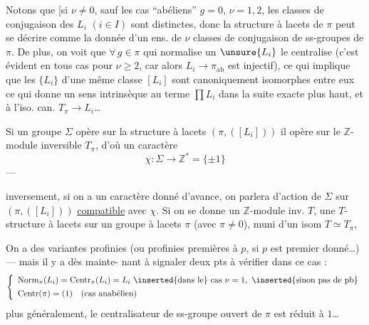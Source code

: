 
Notons que [si $\nu\ne0$, \inserted{et]} sauf les cas ``abéliens''
$g=0$, $\nu=1,2$, les classes de conjugaison
des $L_i$ $(i\in I)$ sont distinctes, donc la
structure à lacets de $\pi$ peut se décrire
comme la donnée d'un ens. de $\nu$ classes de
conjugaison de ss-groupes de $\pi$. De plus,
on voit que $\forall\,g\in\pi$ qui normalise
un $\unsure{L_i}$ le centralise (c'est évident
en tous cas pour $\nu\ge2$, car alors
$L_i\to\pi_{\mathrm{ab}}$ est injectif), ce qui implique
que les $\{L_i\}$ d'une même classe $[L_i]$
sont canoniquement isomorphes entre eux
ce qui donne un sens intrinsèque au
terme $\prod L_i$ dans la suite exacte
plus haut, et à l'iso. can. $T_\pi\to L_i$\dots
{}

Si un groupe $\Sigma$ opère sur la structure
à lacets $(\pi,([L_i]))$ il opère sur le
$\mathbb Z$-module inversible $T_\pi$, d'où un
caractère
\[
\chi:\Sigma\longrightarrow\mathbb Z^{*}=\{\pm1\}
\]
---


inversement, si on a un caractère  donné d'avance,
on parlera d'action de $\Sigma$ sur $(\pi,([L_i]))$
\uline{compatible} avec $\chi$. Si on se donne un
$\mathbb Z$-module inv. $T$, une $T$-structure à lacets
sur un groupe à lacets $\pi$ (avec $\pi\ne0$), muni
d'un isom $T\simeq T_\pi$, 

On a des variantes profinies
(ou profinies premières à $p$, si $p$ est premier
donné\dots) --- mais il y a dès mainte-
nant à signaler deux pts à vérifier dans
ce cas :
\[
\left\{
\begin{array}{l}
\operatorname{Norm}_{\pi}(L_i)=\operatorname{Centr}_{\pi}(L_i)=L_i
\ \inserted{\text{dans le}}\ \text{cas }\nu=1,\ \inserted{\text{sinon pas de pb}}\\[4pt]
\operatorname{Centr}(\pi)=(1)\quad(\text{cas anabélien})
\end{array}
\right.
\]
plus généralement, le centralisateur
de  ss-groupe ouvert de $\pi$
est réduit à $1$\dots
{}

